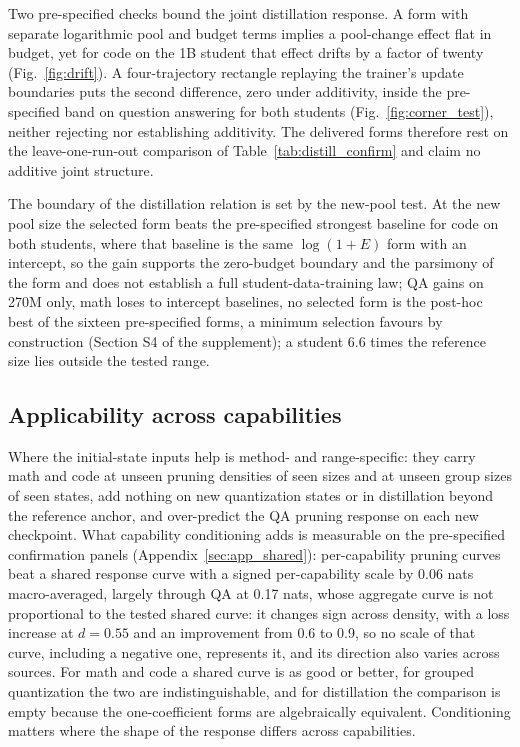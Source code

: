 Two pre-specified checks bound the joint distillation response. A form with separate logarithmic pool
and budget terms implies a pool-change effect flat in budget, yet for code on the 1B student that
effect drifts by a factor of twenty (Fig.~\ref{fig:drift}). A four-trajectory rectangle replaying the
trainer's update boundaries puts the second difference, zero under additivity, inside the
pre-specified band on question answering for both students (Fig.~\ref{fig:corner_test}), neither
rejecting nor establishing additivity. The delivered forms therefore rest on the leave-one-run-out
comparison of Table~\ref{tab:distill_confirm} and claim no additive joint structure.

The boundary of the distillation relation is set by the new-pool test. At the new pool size the
selected form beats the
pre-specified strongest baseline for code on both students, where that
baseline is the same $\log(1+E)$ form with an intercept, so the gain
supports the zero-budget boundary and the parsimony of the form and does not
establish a full student-data-training law; QA gains on 270M only, math loses to intercept baselines, no selected form is the post-hoc best of the sixteen pre-specified forms, a minimum selection favours by construction (Section S4 of the supplement); a student 6.6 times the reference size lies outside the tested range.

\subsection{Applicability across capabilities}
\label{sec:app_applic}

Where the initial-state inputs help is method- and range-specific:
they carry math and code at unseen pruning densities of seen sizes
and at unseen group sizes of seen states, add nothing on new
quantization states or in distillation beyond the reference anchor,
and over-predict the QA pruning response on each new checkpoint. What capability conditioning adds is measurable on the pre-specified
confirmation panels (Appendix~\ref{sec:app_shared}): per-capability
pruning curves beat a shared response curve with a signed
per-capability scale by 0.06 nats macro-averaged, largely through QA at 0.17 nats, whose aggregate curve is not proportional to the tested shared curve:
it changes sign across density, with a loss increase at $d=0.55$ and an improvement from 0.6 to 0.9, so no scale of that curve, including a negative one, represents it, and its direction also varies across sources. For math and
code a shared curve is as good or better, for grouped quantization the two are indistinguishable, and for distillation the
comparison is empty because the one-coefficient forms are
algebraically equivalent. Conditioning matters where the shape of the
response differs across capabilities.



